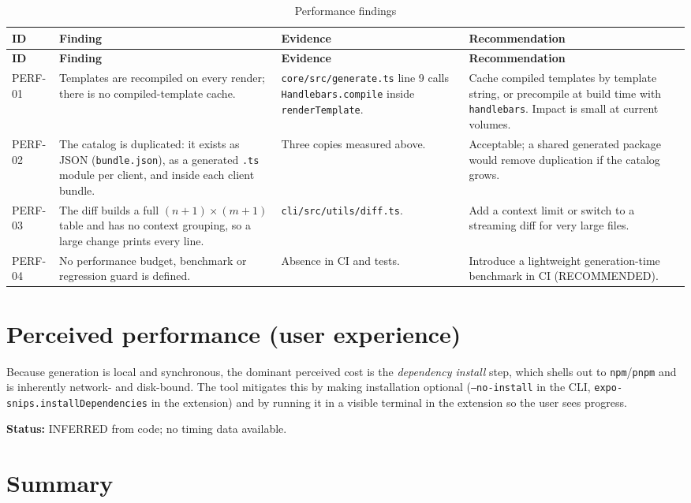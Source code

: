 \begin{longtable}{@{}L{1.4cm}L{4cm}L{4cm}L{4.4cm}@{}}
\caption{Performance findings}\\
\toprule
\textbf{ID} & \textbf{Finding} & \textbf{Evidence} & \textbf{Recommendation} \\
\midrule
\endfirsthead
\toprule
\textbf{ID} & \textbf{Finding} & \textbf{Evidence} & \textbf{Recommendation} \\
\midrule
\endhead
PERF-01 & Templates are recompiled on every render; there is no compiled-template
cache. & \texttt{core/src/generate.ts} line 9 calls
\texttt{Handlebars.compile} inside \texttt{renderTemplate}. & Cache compiled
templates by template string, or precompile at build time with
\texttt{handlebars}. Impact is small at current volumes. \\
PERF-02 & The catalog is duplicated: it exists as JSON
(\texttt{bundle.json}), as a generated \texttt{.ts} module per client, and inside
each client bundle. & Three copies measured above. & Acceptable; a shared
generated package would remove duplication if the catalog grows. \\
PERF-03 & The diff builds a full $(n+1)\times(m+1)$ table and has no context
grouping, so a large change prints every line. & \texttt{cli/src/utils/diff.ts}. &
Add a context limit or switch to a streaming diff for very large files. \\
PERF-04 & No performance budget, benchmark or regression guard is defined. &
Absence in CI and tests. & Introduce a lightweight generation-time benchmark in
CI (RECOMMENDED). \\
\bottomrule
\end{longtable}

\section{Perceived performance (user experience)}

Because generation is local and synchronous, the dominant perceived cost is the
\emph{dependency install} step, which shells out to \texttt{npm}/\texttt{pnpm}
and is inherently network- and disk-bound. The tool mitigates this by making
installation optional (\texttt{--no-install} in the CLI,
\texttt{expo-snips.installDependencies} in the extension) and by running it in a
visible terminal in the extension so the user sees progress.

\textbf{Status:} INFERRED from code; no timing data available.

\section{Summary}

